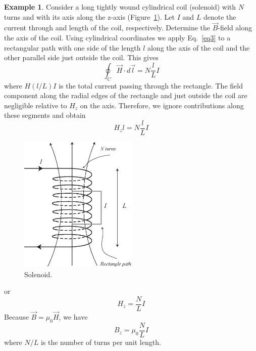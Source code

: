 \documentclass[11pt,a4paper,oneside]{book}
\numberwithin{equation}{section}
\theoremstyle{it}
\theoremstyle{definition}
\newtheorem{example}{Example}[section]
\begin{document}
\begin{example}
Consider a long tightly wound cylindrical coil (solenoid) with $N$ turns and with its axis along the z-axis (Figure~\ref{solenoid}). Let $I$ and $L$ denote the current through and length of the coil, respectively. Determine the $\vec{B}$-field along the axis of the coil.
Using cylindrical coordinates we apply Eq.~\eqref{eq3} to a rectangular path with one side of the length $l$ along the axis of the coil and the other parallel side just outside the coil. This gives
\begin{equation*}\label{}
	\oint_{C}\vec{H}\cdot d\vec{l}=N\frac{l}{L}I
\end{equation*}
where $H(l/L)I$ is the total current passing through the rectangle. The field component along the radial edges of the rectangle and just outside the coil are negligible relative to $H_z$ on the axis.  Therefore, we ignore contributions along these segments and obtain
\begin{equation}\label{}
	H_zl=N\frac{l}{L}I
\end{equation}
\begin{figure}[H]
	\centering
	\includegraphics[width = 0.5\textwidth, width = 200pt, angle = 0, keepaspectratio]{figures/solenoid.eps}
	\captionsetup{width=0.75\textwidth}		
	\caption{Solenoid.}
	\label{solenoid}
\end{figure}
or 
\begin{equation*}\label{}
	H_z=\frac{N}{L}I
\end{equation*}
Because $\vec{B}=\mu_0\vec{H}$, we have 
\begin{equation*}\label{}
	B_z=\mu_0\frac{N}{L}I
\end{equation*}
where $N/L$ is the number of turns per unit length.
\end{example}
\end{document}
